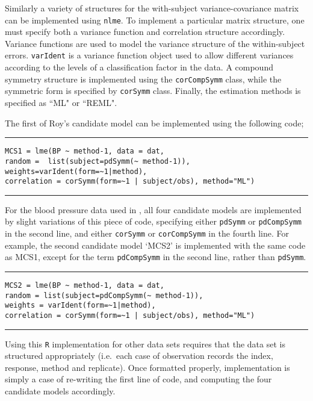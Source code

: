 \documentclass[12pt, a4paper]{report}
\theoremstyle{plain}
\theoremstyle{definition}
\theoremstyle{remark}
\begin{document}
Similarly a variety of structures for the with-subject variance-covariance matrix can be implemented using \texttt{nlme}. To implement a particular matrix structure, one must specify both a variance function and correlation structure accordingly. Variance functions are used to model the variance structure of the within-subject errors. \texttt{varIdent} is a variance function object used to allow different variances according to the levels of a classification factor in the data. A compound symmetry structure is implemented using the \texttt{corCompSymm} class, while the symmetric form is specified by \texttt{corSymm} class. Finally, the estimation methods is specified as ``ML" or ``REML".

The first of Roy's candidate model can be implemented using the following code;\\
\hrule
\begin{verbatim}
MCS1 = lme(BP ~ method-1, data = dat,
random =  list(subject=pdSymm(~ method-1)),
weights=varIdent(form=~1|method),
correlation = corSymm(form=~1 | subject/obs), method="ML")
\end{verbatim}
\hrule
\vspace{1cm}
For the blood pressure data used in \citet{roy}, all four candidate models are implemented by slight variations of this piece of code, specifying either \texttt{pdSymm} or \texttt{pdCompSymm} in the second line, and either \texttt{corSymm} or \texttt{corCompSymm} in the fourth line.
For example, the second candidate model `MCS2' is implemented with the same code as MCS1, except for the term \texttt{pdCompSymm} in the second line, rather than \texttt{pdSymm}.
\\
\hrule
\begin{verbatim}
MCS2 = lme(BP ~ method-1, data = dat,
random = list(subject=pdCompSymm(~ method-1)),
weights = varIdent(form=~1|method),
correlation = corSymm(form=~1 | subject/obs), method="ML")
\end{verbatim}
\hrule
\vspace{1cm}
Using this \texttt{R} implementation for other data sets requires that the data set is structured appropriately (i.e.\ each case of observation records the index, response, method and replicate). Once formatted properly, implementation is simply a case of re-writing the first line of code, and computing the four candidate models accordingly.
\end{document}
